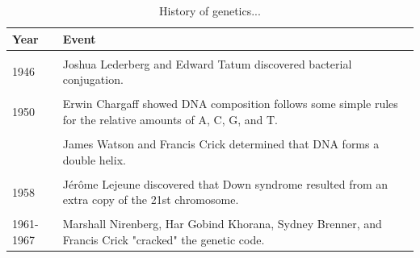 \documentclass[11pt,ignorenonframetext,aspectratio=169]{beamer}
\begin{document}
\begin{frame}{}
\protect\hypertarget{section-11}{}
\begin{table}

\caption{\label{tab:history-table2}History of genetics...}
\centering
\fontsize{8}{10}\selectfont
\begin{tabular}[t]{l>{\raggedright\arraybackslash}p{40em}}
\toprule
Year & Event\\
\midrule
\cellcolor{gray!6}{1944} & \cellcolor{gray!6}{Oswald Avery, Colin MacLeod, and Maclyn McCarty provided compelling evidence that DNA is the genetic material in bacterial cells.}\\
1946 & Joshua Lederberg and Edward Tatum discovered bacterial conjugation.\\
\cellcolor{gray!6}{1948} & \cellcolor{gray!6}{Barbara McClintock discovered mobile elements (transposons) that move from one place to another in the genome.}\\
1950 & Erwin Chargaff showed DNA composition follows some simple rules for the relative amounts of A, C, G, and T.\\
\cellcolor{gray!6}{1952} & \cellcolor{gray!6}{Alfred Hershey and Martha Chase proved that DNA is the molecule that encodes genetic information.}\\
\addlinespace
1953 & James Watson and Francis Crick determined that DNA forms a double helix.\\
\cellcolor{gray!6}{1958} & \cellcolor{gray!6}{Matthew Meselson and Franklin Stahl demonstrated the semiconservative nature of DNA replication.}\\
1958 & Jérôme Lejeune discovered that Down syndrome resulted from an extra copy of the 21st chromosome.\\
\cellcolor{gray!6}{1961} & \cellcolor{gray!6}{François Jacob and Jacques Monod proposed that enzyme levels in cells are controlled by feedback mechanisms.}\\
1961-1967 & Marshall Nirenberg, Har Gobind Khorana, Sydney Brenner, and Francis Crick "cracked" the genetic code.\\
\bottomrule
\end{tabular}
\end{table}
\end{frame}
\end{document}
